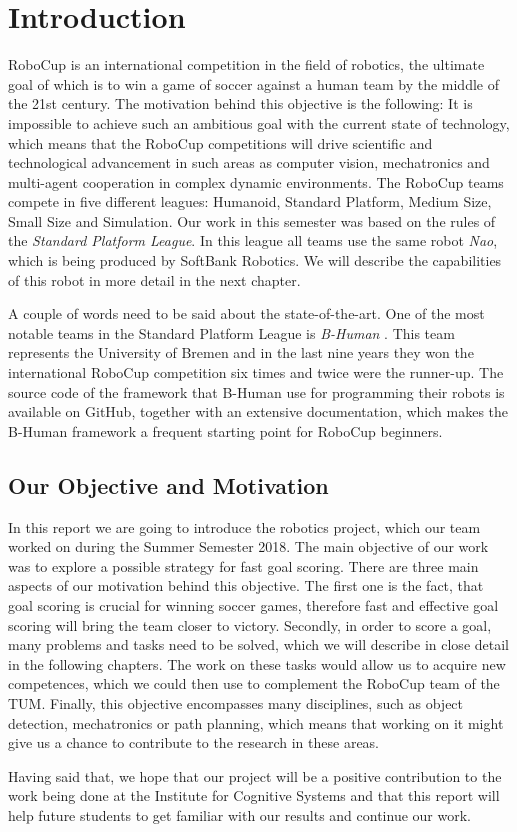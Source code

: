 \chapter{Introduction}

RoboCup \cite{robocup} is an international competition in the field of
robotics, the ultimate goal of which is to win a game of soccer against a human
team by the middle of the 21st century. The motivation behind this objective is
the following: It is impossible to achieve such an ambitious goal with the
current state of technology, which means that the RoboCup competitions will
drive scientific and technological advancement in such areas as computer
vision, mechatronics and multi-agent cooperation in complex dynamic
environments. The RoboCup teams compete in five different leagues: Humanoid,
Standard Platform, Medium Size, Small Size and Simulation. Our work in this
semester was based on the rules of the \textit{Standard Platform League}. In
this league all teams use the same robot \textit{Nao}, which is being produced
by SoftBank Robotics. We will describe the capabilities of this robot in
more detail in the next chapter.

A couple of words need to be said about the state-of-the-art. One of the most
notable teams in the Standard Platform League is \textit{B-Human}
\cite{bhuman}. This team represents the University of Bremen and in the last
nine years they won the international RoboCup competition six times and twice
were the runner-up. The source code of the framework that B-Human use for
programming their robots is available on GitHub, together with an extensive
documentation, which makes the B-Human framework a frequent starting point for
RoboCup beginners.

\section{Our Objective and Motivation}
\label{sec problem statement}

In this report we are going to introduce the robotics project, which our team
worked on during the Summer Semester 2018. The main objective of our work was
to explore a possible strategy for fast goal scoring. There are three main
aspects of our motivation behind this objective. The first one is the fact,
that goal scoring is crucial for winning soccer games, therefore fast and
effective goal scoring will bring the team closer to victory. Secondly, in
order to score a goal, many problems and tasks need to be solved, which we will
describe in close detail in the following chapters. The work on these tasks
would allow us to acquire new competences, which we could then use to
complement the RoboCup team of the TUM. Finally, this objective encompasses
many disciplines, such as object detection, mechatronics or path planning,
which means that working on it might give us a chance to contribute to the
research in these areas.

Having said that, we hope that our project will be a positive contribution to
the work being done at the Institute for Cognitive Systems and that this
report will help future students to get familiar with our results and continue
our work.

